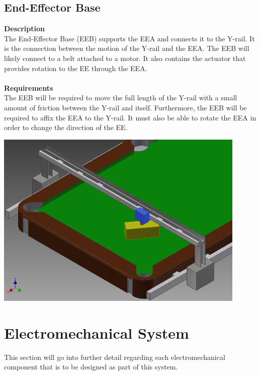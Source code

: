 \documentclass[titlepage]{article}
\begin{document}
\subsection{End-Effector Base}
\textbf{Description}\\
The End-Effector Base (EEB) supports the EEA and connects it to the Y-rail. It is the connection between the motion of the Y-rail and the EEA. The EEB will likely connect to a belt attached to a motor. It also contains the actuator that provides rotation to the EE through the EEA.\\\\
\textbf{Requirements}\\
The EEB will be required to move the full length of the Y-rail with a small amount of friction between the Y-rail and itself. Furthermore, the EEB will be required to affix the EEA to the Y-rail. It must also be able to rotate the EEA in order to change the direction of the EE.
\begin{center}
	\includegraphics[width = 0.9\textwidth]{efBase.png}
\label{fig:eebFig}
\end{center}


\newpage
\section{Electromechanical System}
This section will go into further detail regarding each electromechanical component that is to be designed as part of this system.
\end{document}

